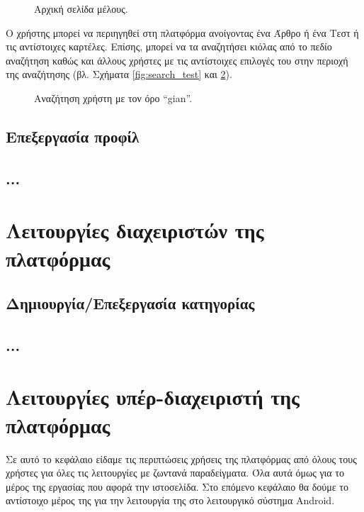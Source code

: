 \begin{figure}[tbh]
\caption{Αρχική σελίδα μέλους.}
\label{fig:start_page_user}
\end{figure}

Ο χρήστης μπορεί να περιηγηθεί στη πλατφόρμα ανοίγοντας ένα Άρθρο ή ένα Τεστ ή τις αντίστοιχες καρτέλες. Επίσης, μπορεί να τα αναζητήσει κιόλας από το πεδίο αναζήτηση καθώς και άλλους χρήστες με τις αντίστοιχες επιλογές του στην περιοχή της αναζήτησης (βλ. Σχήματα \ref{fig:search_test} και \ref{fig:search_user}).


\begin{figure}[tbh]
	\begin{minipage}[t]{0.45\linewidth}
	\centering
	\caption{Αναζήτηση τεστ με τον όρο \textquotedblleft καρδ\textquotedblright.}
	\label{fig:search_test}	
	\end{minipage}\hfill
	\begin{minipage}[t]{0.45\linewidth}
	\centering
	\caption{Αναζήτηση χρήστη με τον όρο \textlatin{\textquotedblleft gian\textquotedblright .}}
	\label{fig:search_user}
	\end{minipage} 
\end{figure}


\subsection{Επεξεργασία προφίλ}


\subsection{...}

\section{Λειτουργίες διαχειριστών της πλατφόρμας}


\subsection{Δημιουργία/Επεξεργασία κατηγορίας}

\subsection{...}	



\section{Λειτουργίες υπέρ-διαχειριστή της πλατφόρμας}



Σε αυτό το κεφάλαιο είδαμε τις περιπτώσεις χρήσεις της πλατφόρμας από όλους τους χρήστες για όλες τις λειτουργίες με ζωντανά παραδείγματα. Όλα αυτά όμως για το μέρος της εργασίας που αφορά την ιστοσελίδα. Στο επόμενο κεφάλαιο θα δούμε το αντίστοιχο μέρος της για την λειτουργία της στο λειτουργικό σύστημα \textlatin{Android.}